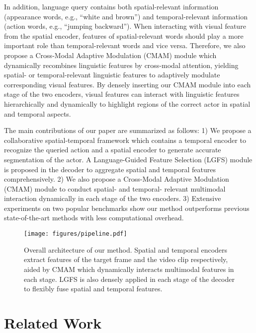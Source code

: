 \documentclass[final]{cvpr}
\begin{document}
In addition, language query contains both spatial-relevant information (appearance words, e.g., ``white and brown'') and temporal-relevant information (action words, e.g., ``jumping backward''). 
When interacting with visual feature from the spatial encoder, features of spatial-relevant words should play a more important role than temporal-relevant words and vice versa. 
Therefore, we also propose a Cross-Modal Adaptive Modulation (CMAM) module which dynamically recombines linguistic features by cross-modal attention, yielding spatial- or temporal-relevant linguistic features to adaptively modulate corresponding visual features. 
By densely inserting our CMAM module into each stage of the two encoders, visual features can interact with linguistic features hierarchically and dynamically to highlight regions of the correct actor in spatial and temporal aspects. 

The main contributions of our paper are summarized as follows:
1) We propose a collaborative spatial-temporal framework which contains a temporal encoder to recognize the queried action and a spatial encoder to generate accurate segmentation of the actor. 
A Language-Guided Feature Selection (LGFS) module is proposed in the decoder to aggregate spatial and temporal features comprehensively. 
2) We also propose a Cross-Modal Adaptive Modulation (CMAM) module to conduct spatial- and temporal- relevant multimodal interaction dynamically in each stage of the two encoders. 
3) Extensive experiments on two popular benchmarks show our method outperforms previous state-of-the-art methods with less computational overhead.

\begin{figure*}[t]
   \begin{center}
      \texttt{[image: figures/pipeline.pdf]}
   \end{center}
      \caption{Overall architecture of our method. Spatial and temporal encoders extract features of the target frame and the video clip respectively, aided by CMAM which dynamically interacts multimodal features in each stage. LGFS is also densely applied in each stage of the decoder to flexibly fuse spatial and temporal features.}
   \label{fig:pipeline}
\end{figure*}


\section{Related Work}
\end{document}
